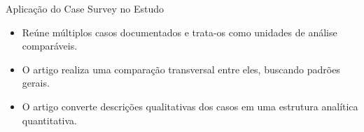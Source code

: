 \begin{frame}{Aplicação do Case Survey no Estudo}

\begin{itemize}
    \item Reúne múltiplos casos documentados e trata-os como unidades de análise comparáveis.
    \item O artigo realiza uma comparação transversal entre eles, buscando padrões gerais.
    \item O artigo converte descrições qualitativas dos casos em uma estrutura analítica quantitativa.
\end{itemize}
\end{frame}